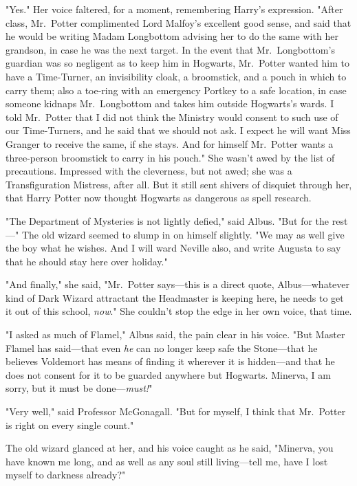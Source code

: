 "Yes." Her voice faltered, for a moment, remembering Harry's expression. "After
class, Mr.~Potter complimented Lord Malfoy's excellent good sense, and said
that he would be writing Madam Longbottom advising her to do the same with her
grandson, in case he was the next target. In the event that Mr.~Longbottom's
guardian was so negligent as to keep him in Hogwarts, Mr.~Potter wanted him to
have a Time-Turner, an invisibility cloak, a broomstick, and a pouch in which
to carry them; also a toe-ring with an emergency Portkey to a safe location, in
case someone kidnaps Mr.~Longbottom and takes him outside Hogwarts's wards. I
told Mr.~Potter that I did not think the Ministry would consent to such use of
our Time-Turners, and he said that we should not ask. I expect he will want
Miss Granger to receive the same, if she stays. And for himself Mr.~Potter
wants a three-person broomstick to carry in his pouch." She wasn't awed by the
list of precautions. Impressed with the cleverness, but not awed; she was a
Transfiguration Mistress, after all. But it still sent shivers of disquiet
through her, that Harry Potter now thought Hogwarts as dangerous as spell
research.

"The Department of Mysteries is not lightly defied," said Albus. "But for the
rest\mbox{---}" The old wizard seemed to slump in on himself slightly. "We may as well
give the boy what he wishes. And I will ward Neville also, and write Augusta to
say that he should stay here over holiday."

"And finally," she said, "Mr.~Potter says---this is a direct quote,
Albus---whatever kind of Dark Wizard attractant the Headmaster is keeping here,
he needs to get it out of this school, \emph{now}." She couldn't stop the edge
in her own voice, that time.

"I asked as much of Flamel," Albus said, the pain clear in his voice. "But
Master Flamel has said---that even \emph{he} can no longer keep safe the
Stone---that he believes Voldemort has means of finding it wherever it is
hidden---and that he does not consent for it to be guarded anywhere but
Hogwarts. Minerva, I am sorry, but it must be done---\emph{must!}"

"Very well," said Professor McGonagall. "But for myself, I think that
Mr.~Potter is right on every single count."

The old wizard glanced at her, and his voice caught as he said, "Minerva, you
have known me long, and as well as any soul still living---tell me, have I lost
myself to darkness already?"

